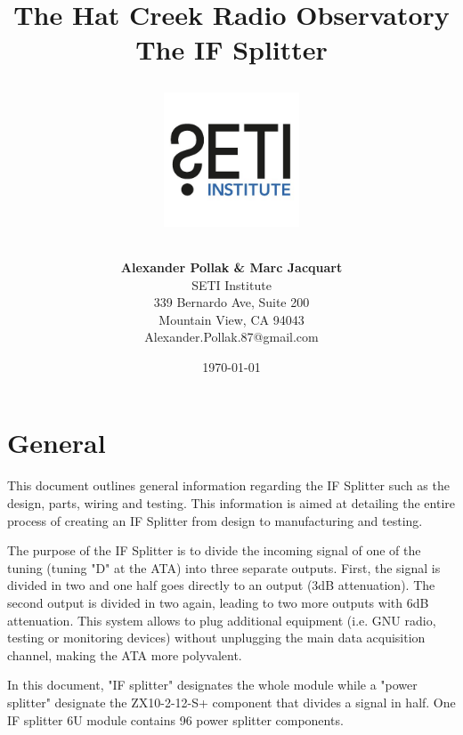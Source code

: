\documentclass[12pt,a4paper,oneside]{article}
\title{\Huge The Hat Creek Radio Observatory\\
\vspace{0.5cm}
The IF Splitter\\
\vspace{0.5cm}
\normalsize \emph{}
\vspace{3.5cm}
\begin{center}
\includegraphics[height=4cm]{titlepage/SETI_institute_logo.jpg}
\end{center}
}
\author{ 
\vspace{1cm}
\Large
\textbf{ Alexander Pollak \& Marc Jacquart} \\
SETI Institute \\ 
339 Bernardo Ave, Suite 200 \\
Mountain View, CA 94043 \\ 
Alexander.Pollak.87@gmail.com\\
}
\date{\today}
\begin{document}
\clearpage\maketitle
\thispagestyle{empty}

%



%

\newpage

\section{General}
\label{sec:General}

This document outlines general information regarding the IF Splitter such as the design, parts, wiring and testing. This information is aimed at detailing the entire process of creating an IF Splitter from design to manufacturing and testing. 

The purpose of the IF Splitter is to divide the incoming signal of one of the tuning (tuning "D" at the ATA) into three separate outputs. First, the signal is divided in two and one half goes directly to an output (3dB attenuation). The second output is divided in two again, leading to two more outputs with 6dB attenuation. This system allows to plug additional equipment (i.e. GNU radio, testing or monitoring devices) without unplugging the main data acquisition channel, making the ATA more polyvalent.

In this document, "IF splitter" designates the whole module while a "power splitter" designate the ZX10-2-12-S+ component that divides a signal in half. One IF splitter 6U module contains 96 power splitter components.
\end{document}
